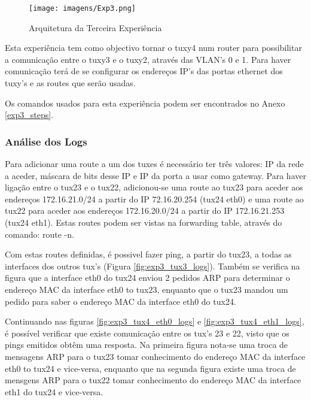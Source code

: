 \begin{figure}[h!]
\centering
\texttt{[image: imagens/Exp3.png]}
\caption{Arquitetura da Terceira Experiência}
\label{fig:exp3}
\end{figure}

Esta experiência tem como objectivo tornar o tuxy4 num router para possibilitar a comunicação entre o tuxy3 e o tuxy2, através das VLAN's 0 e 1. Para haver comunicação terá de se configurar os endereços IP's das portas ethernet dos tuxy's e as routes que serão usadas.

Os comandos usados para esta experiência podem ser encontrados no Anexo \ref{exp3_steps}.


\subsubsection{Análise dos Logs}

Para adicionar uma route a um dos tuxes é necessário ter três valores: IP da rede a aceder, máscara de bits desse IP e IP da porta a usar como gateway. Para haver ligação entre o tux23 e o tux22, adicionou-se uma route ao tux23 para aceder aos endereços 172.16.21.0/24 a partir do IP 72.16.20.254 (tux24 eth0) e uma route ao tux22 para aceder aos endereços 172.16.20.0/24 a partir do IP 172.16.21.253 (tux24 eth1). Estas routes podem ser vistas na forwarding table, através do comando: route -n.

Com estas routes definidas, é possivel fazer ping, a partir do tux23, a todas as interfaces dos outros tux's (Figura \ref{fig:exp3_tux3_logs}). Também se verifica na figura que a interface eth0 do tux24 enviou 2 pedidos ARP para determinar o endereço MAC da interface eth0 to tux23, enquanto que o tux23 mandou um pedido para saber o endereço MAC da interface eth0 do tux24.

Continuando nas figuras \ref{fig:exp3_tux4_eth0_logs} e \ref{fig:exp3_tux4_eth1_logs}, é possível verificar que existe comunicação entre os tux's 23 e 22, visto que os pings emitidos obtêm uma resposta. Na primeira figura nota-se uma troca de mensagens ARP para o tux23 tomar conhecimento do endereço MAC da interface eth0 to tux24 e vice-versa, enquanto que na segunda figura existe uma troca de mensgens ARP para o tux22 tomar conhecimento do endereço MAC da interface eth1 do tux24 e vice-versa.